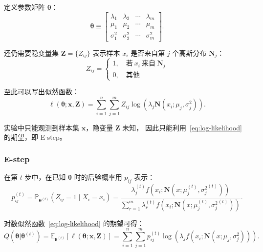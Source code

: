 定义参数矩阵 $\boldsymbol{\theta}$：
\begin{equation}
    \boldsymbol{\theta}\equiv
    \begin{bmatrix}
        \lambda_1 & \lambda_2 & \cdots & \lambda_m \\
        \mu_1 & \mu_2 & \cdots & \mu_m \\
        \sigma_1^2 & \sigma_2^2 & \cdots & \sigma_m^2
        \end{bmatrix}.
\end{equation}

还仍需要隐变量集 $\boldsymbol{Z}=\{Z_{ij}\}$ 表示样本 $x_i$ 是否来自第 $j$ 个高斯分布 $\mathbf{N}_j$：
\begin{equation}
    Z_{ij}=
    \begin{cases}
    1,\quad\text{若}\ x_i\ \text{来自}\ \mathbf{N}_j \\
    0,\quad\text{其他}
    \end{cases}
\end{equation}

至此可以写出似然函数：
\begin{equation}
    \label{eq:log-likelihood}
    \ell(\boldsymbol{\theta};\mathbf{x},\mathbf{Z})=
    \sum_{i=1}^n\sum_{j=1}^mZ_{ij}\log\left(\lambda_j\mathbf{N}(x_i;\mu_j, \sigma_j^2)\right).
\end{equation}

实验中只能观测到样本集 $\boldsymbol{x}$，隐变量 $\boldsymbol{Z}$ 未知，
因此只能利用~\eqref{eq:log-likelihood} 的期望，即 E-step。

\subsubsection{E-step}
在第 $t$ 步中，在已知 $\boldsymbol{\theta}$ 时的后验概率用 $p_{ij}$ 表示：
\begin{equation}
    p_{ij}^{(t)}=\mathbb{P}_{\boldsymbol{\theta}^{(t)}}\left(Z_{ij}=1
    \mid X_i=x_i\right)=\frac{\lambda_j^{(t)}f(x_i;\mathbf{N}(x;\mu_j^{(t)}, {\sigma_j^2}^{(t)}))}
    {\sum_{r=1}^m\lambda_r^{(t)}f(x_i;\mathbf{N}(x;\mu_j^{(t)}, {\sigma_j^2}^{(t)}))}.
\end{equation}

对数似然函数~\eqref{eq:log-likelihood} 的期望可得：
\begin{equation}
    \label{eq:em_expectation}
    Q(\boldsymbol{\theta}|\boldsymbol{\theta}^{(t)})=
    \mathbb{E}_{\boldsymbol{\theta}^{(t)}}\left[\ell(\boldsymbol{\theta};
    \mathbf{x},\mathbf{Z})\right]=
    \sum_{i=1}^n\sum_{j=1}^mp_{ij}^{(t)}\log\left(\lambda_jf(x_i;\mathbf{N}(x;\mu_j, \sigma_j^2))\right).
\end{equation}

